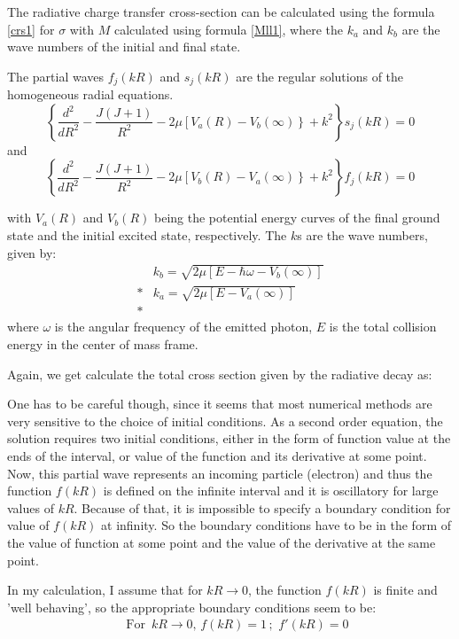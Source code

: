 The radiative charge transfer cross-section can be calculated using the formula \eqref{crs1} for $ \sigma $ with $ M $ calculated using formula \eqref{Mll1}, where the $ k_a $ and $ k_b $ are the wave numbers of the initial and final state. 

The partial waves $ f_j(kR) $ and $ s_j(kR) $ are the regular solutions of the homogeneous radial equations.
\begin{equation}
\left\{\frac{d^2}{dR^2} - \frac{J(J+1)}{R^2} - 2\mu\left[V_a(R) - V_b(\infty)\right\} + k^2\right\}s_j(kR) = 0
\end{equation}
and
\begin{equation}
\left\{\frac{d^2}{dR^2} - \frac{J(J+1)}{R^2} - 2\mu\left[V_b(R) - V_a(\infty)\right\} + k^2\right\}f_j(kR) = 0
\end{equation}

with $ V_a(R) $ and $ V_b(R) $ being the potential energy curves of the final ground state and the initial excited state, respectively. The $ k $s are the wave numbers, given by:
\begin{equation}
\begin{split}
& k_b = \sqrt{2\mu\left[E - \hbar\omega - V_b(\infty)\right]} \\*
& k_a = \sqrt{2\mu\left[E - V_a(\infty)\right]} \\*
\end{split}
\end{equation}
where $ \omega$ is the angular frequency of the emitted photon, $ E $ is the total collision energy in the center of mass frame.

Again, we get calculate the total cross section given by the radiative decay as:

One has to be careful though, since it seems that most numerical methods are very sensitive to the choice of initial conditions.  As a second order equation, the solution requires two initial conditions, either in the form of function value at the ends of the interval, or value of the function and its derivative at some point. Now, this partial wave represents an incoming particle (electron) and thus the function  $  f(kR) $  is defined on the infinite interval and it is oscillatory for large values of $ kR $. Because of that, it is impossible to specify a boundary condition for value of $  f(kR) $ at infinity. So the boundary conditions have to be in the form of the value of function at some point and the value of the derivative at the same point. 

In my calculation, I assume that  for $ kR \rightarrow 0 $, the function $  f(kR) $ is finite and 'well  behaving', so the appropriate boundary conditions seem to be: 
\begin{equation}
\begin{split}
& \text{ For }\,kR \rightarrow 0,\,f(kR) = 1\,;\,\,f'(kR)  = 0
\end{split}
\end{equation}

